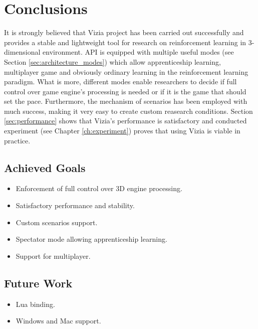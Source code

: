 \chapter{Conclusions}
	It is strongly believed that Vizia project has been carried out successfully and provides a stable and lightweight tool for research on reinforcement learning in 3-dimensional environment. API is equipped with multiple useful modes (see Section \ref{sec:architecture_modes}) which allow apprenticeship learning, multiplayer game and obviously ordinary learning in the reinforcement learning paradigm. What is more, different modes enable researchers to decide if full control over game engine's processing is needed or if it is the game that should set the pace. Furthermore, the mechanism of scenarios has been employed with much success, making it very easy to create custom reasearch conditions. Section \ref{sec:performance} shows that Vizia's performance is satisfactory and conducted experiment (see Chapter \ref{ch:experiment}) proves that using Vizia is viable in practice. 

\section{Achieved Goals}
	\begin{itemize}
		\item Enforcement of full control over 3D engine processing.
		\item Satisfactory performance and stability.
		\item Custom scenarios support.
		\item Spectator mode allowing apprenticeship learning.
		\item Support for multiplayer.
	\end{itemize}

\section{Future Work}
	\begin{itemize}
		\item Lua binding.
		\item Windows and Mac support.
	\end{itemize}